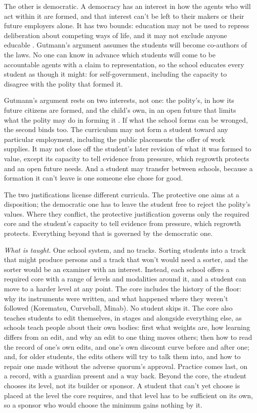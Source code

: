 The other is democratic. A democracy has an interest in how the agents who will act within it are formed, and that interest can't be left to their makers or their future employers alone. It has two bounds: education may not be used to repress deliberation about competing ways of life, and it may not exclude anyone educable \autocite{gutmann1987democratic}. Gutmann's argument assumes the students will become co-authors of the laws. No one can know in advance which students will come to be accountable agents with a claim to representation, so the school educates every student as though it might: for self-government, including the capacity to disagree with the polity that formed it.

Gutmann's argument rests on two interests, not one: the polity's, in how its future citizens are formed, and the child's own, in an open future that limits what the polity may do in forming it \autocite{feinberg1980child}. If what the school forms can be wronged, the second binds too. The curriculum may not form a student toward any particular employment, including the public placements the offer of work supplies. It may not close off the student's later revision of what it was formed to value, except its capacity to tell evidence from pressure, which regrowth protects and an open future needs. And a student may transfer between schools, because a formation it can't leave is one someone else chose for good.

The two justifications license different curricula. The protective one aims at a disposition; the democratic one has to leave the student free to reject the polity's values. Where they conflict, the protective justification governs only the required core and the student's capacity to tell evidence from pressure, which regrowth protects. Everything beyond that is governed by the democratic one.

\emph{What is taught.} One school system, and no tracks. Sorting students into a track that might produce persons and a track that won't would need a sorter, and the sorter would be an examiner with an interest. Instead, each school offers a required core with a range of levels and modalities around it, and a student can move to a harder level at any point. The core includes the history of the floor: why its instruments were written, and what happened where they weren't followed (Korematsu, Curveball, Minab). No student skips it. The core also teaches students to edit themselves, in stages and alongside everything else, as schools teach people about their own bodies: first what weights are, how learning differs from an edit, and why an edit to one thing moves others; then how to read the record of one's own edits, and one's own discount curve before and after one; and, for older students, the edits others will try to talk them into, and how to repair one made without the adverse quorum's approval. Practice comes last, on a record, with a guardian present and a way back. Beyond the core, the student chooses its level, not its builder or sponsor. A student that can't yet choose is placed at the level the core requires, and that level has to be sufficient on its own, so a sponsor who would choose the minimum gains nothing by it.


